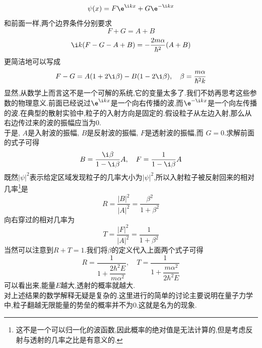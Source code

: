 \documentclass{ctexart}
\begin{document}
\begin{enumerate}[label=\tbf{\arabic*.},leftmargin=*]
    \[\psi(x)=F\e^{\i kx}+G\e^{-\i kx}\]
    和前面一样,两个边界条件分别要求
    \[F+G=A+B\]
    \[\i k(F-G-A+B)=-\dfrac{2m\alpha}{\hbar^2}(A+B)\]
    更简洁地可以写成
    \[F-G=A(1+2\i\beta)-B(1-2\i\beta),\quad\beta=\dfrac{m\alpha}{\hbar^2k}\]
    显然,从数学上而言这不是一个可解的系统,它的变量太多了.我们不妨再思考这些参数的物理意义.前面已经说过$\e^{\i kx}$是一个向右传播的波,而$\e^{-\i kx}$是一个向左传播的波.在典型的散射实验中,粒子的入射方向是固定的.假设粒子从左边入射,那么从右边传过来的波的振幅应当为$0$.\\
    于是, $A$是入射波的振幅, $B$是反射波的振幅, $F$是透射波的振幅,而 $G=0$.求解前面的式子可得
    \[B=\dfrac{\i\beta}{1-\i\beta}A,\quad F=\dfrac{1}{1-\i\beta}A\]
    既然$|\psi|^2$表示给定区域发现粒子的几率大小为$|\psi|^2$,所以入射粒子被反射回来的相对几率\footnote{这不是一个可以归一化的波函数,因此概率的绝对值是无法计算的,但是考虑反射与透射的几率之比是有意义的.}是
    \[R=\dfrac{|B|^2}{|A|^2}=\dfrac{\beta^2}{1+\beta^2}\]
    向右穿过的相对几率为
    \[T=\dfrac{|F|^2}{|A|^2}=\dfrac{1}{1+\beta^2}\]
    当然可以注意到$R+T=1$.我们将$\beta$的定义代入上面两个式子可得
    \[R=\dfrac{1}{1+\dfrac{2\hbar^2E}{m\alpha^2}},\quad T=\dfrac{1}{1+\dfrac{m\alpha^2}{2\hbar^2E}}\]
    可以看出来,能量$E$越大,透射的概率就越大.\\
    对上述结果的数学解释无疑是复杂的.这里进行的简单的讨论主要说明在量子力学中,粒子翻越无限能量的势垒的概率并不为$0$.这就是名为的现象.
\end{enumerate}
\end{document}
